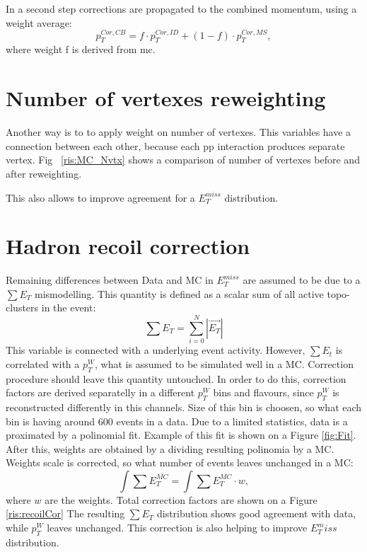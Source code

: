 In a second step corrections are propagated to the combined momentum, using a weight average:
\begin{equation}
p_T^{Cor,CB}= f\cdot p_T^{Cor,ID}+(1-f) \cdot p_T^{Cor,MS},
\end{equation}
where weight f is derived from mc. 

\section{Number of vertexes reweighting}


Another way is to to apply weight on number of vertexes. This variables have a connection between each other, because each pp interaction produces separate vertex. Fig ~\ref{ris:MC_Nvtx} shows a comparison of number of vertexes before and after reweighting.

This also allows to improve agreement for a $E_T^{miss}$ distribution.

\section{Hadron recoil correction}
Remaining differences between Data and MC in $E_T^{miss}$ are assumed to be due to a $\sum E_T$ mismodelling. This quantity is defined as a scalar sum of all active topo-clusters in the event:
\begin{equation}
\sum E_T = \sum\limits^N_{i=0}|\vec{E_T}|
\end{equation}
This variable is connected with a underlying event activity. 
However, $\sum E_t$ is correlated with a $p_T^W$, what is assumed to be simulated well in a MC. Correction procedure should leave this quantity untouched. In order to do this, correction factors are derived separatelly in a different $p_T^W$ bins and flavours, since $p_T^W$ is reconstructed differently in this channels. Size of this bin is choosen, so what each bin is having around 600 events in a data. Due to a limited statistics, data is a proximated by a polinomial fit. Example of this fit is shown on a Figure \ref{fig:Fit}. After this, weights are obtained by a dividing resulting polinomia by a MC. Weights scale is corrected, so what number of events leaves unchanged in a MC:
\begin{equation}
\int \sum E_T^{MC} = \int \sum E_T^{MC} \cdot w,
\end{equation}
where $w$ are the weights. Total correction factors are shown on a Figure \ref{ris:recoilCor}
The resulting $\sum E_T$ distribution shows good agreement with data, while $p_T^W$ leaves unchanged. This correction is also helping to improve $E_T^miss$ distribution.